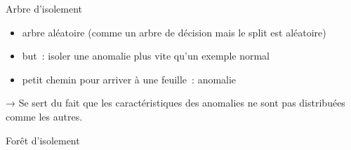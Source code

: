 \begin{frame}{Arbre d'isolement}
  \begin{itemize}
    \item arbre aléatoire (comme un arbre de décision mais le split est aléatoire)
    \item but : isoler une anomalie plus vite qu'un exemple normal
    \item petit chemin pour arriver à une feuille : anomalie
  \end{itemize}

  → Se sert du fait que les caractéristiques des anomalies ne sont pas distribuées comme les autres.
\end{frame}

\begin{frame}{Forêt d'isolement}
\end{frame}
